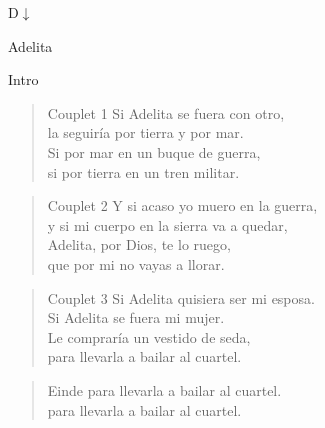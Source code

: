 D$\downarrow$\begin{song}{Adelita}

\begin{instrumental}{Intro}
 \measure{}  \measure{}  \measure{}  
 \measure{}  \measure{}  \measure{}  
\end{instrumental}

\begin{verse}{Couplet 1}
Si Adelita se fuera con otro,\\
la seguir\'ia por tierra y por mar.\\
Si por mar en un buque de guerra,\\
si por tierra en un tren militar.\\
\end{verse}

\begin{verse}{Couplet 2}
Y si acaso yo muero en la guerra,\\
y si mi cuerpo en la sierra va a quedar,\\
Adelita, por Dios, te lo ruego,\\
que por mi no vayas a llorar.\\
\end{verse}

\begin{verse}{Couplet 3}
Si Adelita quisiera ser mi esposa.\\
Si Adelita se fuera mi mujer.\\
Le comprar\'ia un vestido de seda,\\
para llevarla a bailar al cuartel.\\
\end{verse}

\begin{verse}{Einde}
para llevarla a bailar al cuartel.\\
para llevarla a bailar al cuartel.\\
\end{verse}
\end{song}

